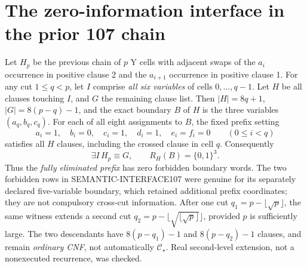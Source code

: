 \documentclass[11pt]{article}
\newcommand{\CS}{\mathcal C_\star}
\begin{document}
\section{The zero-information interface in the prior 107 chain}
Let $H_p$ be the previous chain of $p$ Y cells with adjacent swaps of the $a_i$ occurrence in positive clause 2 and the $a_{i+1}$ occurrence in positive clause 1. For any cut $1\le q<p$, let $I$ comprise \emph{all six variables} of cells $0,\ldots,q-1$. Let $H$ be all clauses touching $I$, and $G$ the remaining clause list. Then $|H|=8q+1$, $|G|=8(p-q)-1$, and the exact boundary $B$ of $H$ is the three variables $(a_q,b_q,c_q)$. For each of all eight assignments to $B$, the fixed prefix setting
\[
a_i=1,\quad b_i=0,\quad c_i=1,\quad d_i=1,\quad e_i=f_i=0\qquad(0\le i<q)
\]
satisfies all $H$ clauses, including the crossed clause in cell $q$. Consequently
\[
\boxed{\exists I\, H_p\equiv G,\qquad R_H(B)=\{0,1\}^{3}.}
\]
Thus the \emph{fully eliminated prefix} has zero forbidden boundary words. The two forbidden rows in SEMANTIC-INTERFACE107 were genuine for its separately declared five-variable boundary, which retained additional prefix coordinates; they are not compulsory cross-cut information.
After one cut $q_1=p-\lfloor\sqrt p\rfloor$, the same witness extends a second cut $q_2=p-\lfloor\sqrt{\lfloor\sqrt p\rfloor}\rfloor$, provided $p$ is sufficiently large. The two descendants have $8(p-q_1)-1$ and $8(p-q_2)-1$ clauses, and remain \emph{ordinary CNF}, not automatically $\CS$. Real second-level extension, not a nonexecuted recurrence, was checked.
\end{document}
